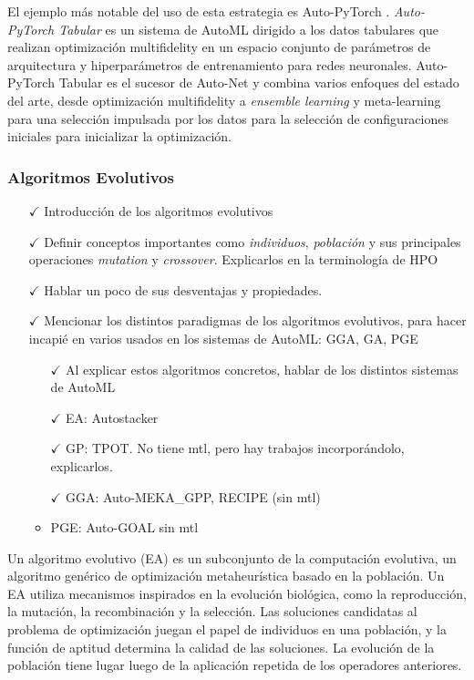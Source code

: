 El ejemplo más notable del uso de esta estrategia es Auto-PyTorch \cite{zimmer2021auto}. \textit{Auto-PyTorch Tabular} es un sistema de AutoML dirigido a los datos tabulares que realizan optimización  multifidelity en un espacio conjunto de parámetros de arquitectura y hiperparámetros de entrenamiento para redes neuronales. Auto-PyTorch Tabular es el sucesor de Auto-Net y combina varios enfoques del estado del arte, desde optimización multifidelity a \textit{ensemble learning} y meta-learning para una selección impulsada por los datos para la selección de configuraciones iniciales para inicializar la optimización.

\subsubsection{Algoritmos Evolutivos}


\begin{itemize}
	\item[$\checkmark$] Introducción de los algoritmos evolutivos
	\item[$\checkmark$] Definir conceptos importantes como \textit{individuos}, \textit{población} y sus principales operaciones \textit{mutation} y \textit{crossover}. Explicarlos en la terminología de HPO
	\item[$\checkmark$] Hablar un poco de sus desventajas y propiedades.
	\item[$\checkmark$] Mencionar los distintos paradigmas de los algoritmos evolutivos, para hacer incapié en varios usados en los sistemas de AutoML: GGA, GA, PGE
	\begin{itemize}
	\item[$\checkmark$] Al explicar estos algoritmos concretos, hablar de los distintos sistemas de AutoML
	\item[$\checkmark$] EA: Autostacker 
	\item[$\checkmark$] GP: TPOT. No tiene mtl, pero hay trabajos incorporándolo, explicarlos.
	\item[$\checkmark$] GGA: Auto-MEKA\_GPP, RECIPE (sin mtl)
	\item PGE: Auto-GOAL sin mtl
	\end{itemize}
\end{itemize}

Un algoritmo evolutivo (EA) es un subconjunto de la computación evolutiva, un algoritmo genérico de optimización metaheurística basado en la población. Un EA utiliza mecanismos inspirados en la evolución biológica, como la reproducción, la mutación, la recombinación y la selección. Las soluciones candidatas al problema de optimización juegan el papel de individuos en una población, y la función de aptitud determina la calidad de las soluciones. La evolución de la población tiene lugar luego de la aplicación repetida de los operadores anteriores.

